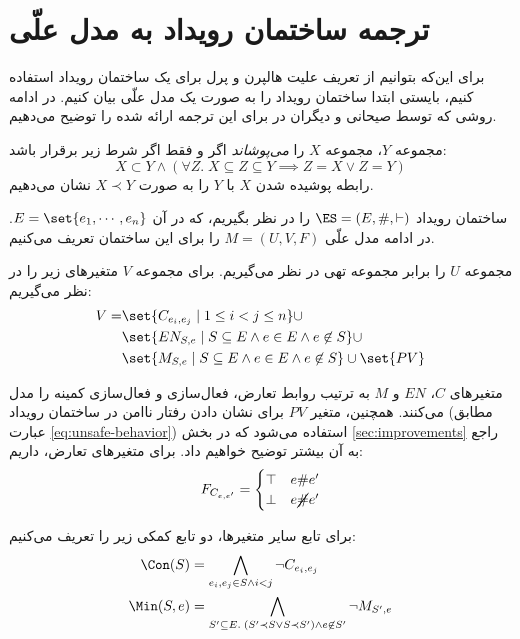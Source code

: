 \section{ترجمه ساختمان رویداد به مدل علّی}\label{sec:es-to-cm}

برای این‌که بتوانیم از تعریف علیت هالپرن و پرل
برای یک ساختمان رویداد استفاده کنیم، بایستی ابتدا
ساختمان رویداد را به صورت یک مدل علّی بیان کنیم. در ادامه
روشی که توسط صیحانی و دیگران در
\cite{seyhani2022}
برای این ترجمه ارائه شده را توضیح می‌دهیم.

\begin{definition}
  مجموعه $Y$،
  مجموعه $X$
  را \textit{می‌پوشاند}
  اگر و فقط اگر شرط زیر برقرار باشد:
  \begin{equation*}
    X \subset Y \wedge \left(
      \forall Z.\;
      X \subseteq Z \subseteq Y \implies Z=X \vee Z=Y 
    \right)
  \end{equation*}
  رابطه پوشیده شدن
  $X$ با $Y$
  را به صورت
  $X \prec Y$
  نشان می‌دهیم.
\end{definition}

ساختمان رویداد
$\ES=(E,\#,\vdash)$
را در نظر بگیریم، که در آن
$E=\set{e_1,\cdots,e_n}$.
در ادامه مدل علّی
$M=(U,V,F)$
را برای این ساختمان تعریف می‌کنیم.

مجموعه $U$
را برابر مجموعه تهی در نظر می‌گیریم.
برای مجموعه $V$
متغیرهای زیر را در نظر می‌گیریم:
\begin{align}
  V = & \set{C_{e_i,e_j} \mid 1 \leq i < j \leq n} \cup \\
  & \set{
    EN_{S,e} \mid
    S \subseteq E \wedge e \in E \wedge e \not\in S
  } \cup \\
  & \set{
    M_{S,e} \mid
    S \subseteq E \wedge e \in E \wedge e \not\in S
  } \cup \set{PV}
\end{align}

متغیرهای
$C$، $EN$ و $M$
به ترتیب روابط تعارض، فعال‌سازی و فعال‌سازی کمینه
را مدل می‌کنند. همچنین، متغیر
$PV$
برای نشان دادن رفتار ناامن در ساختمان رویداد
(مطابق عبارت \ref{eq:unsafe-behavior})
استفاده می‌شود که در بخش
\ref{sec:improvements}
راجع به آن بیشتر توضیح خواهیم داد.
برای متغیرهای تعارض، داریم:
\begin{equation*}
  F_{C_{e,e'}} = \begin{cases}
    \top  & e \# e' \\
    \bot  & e \cancel{\#} e'
  \end{cases}
\end{equation*}

برای تابع سایر متغیرها، دو تابع کمکی زیر را تعریف می‌کنیم:
\begin{align*}
  \Con(S) & =
  \bigwedge_{e_i,e_j \in S \wedge i < j} \neg C_{e_i,e_j} \\
  \Min(S,e) & = \bigwedge_{
    S' \subseteq E.\;
    (S' \prec S \vee S \prec S') \wedge e \not\in S'
  } \neg M_{S',e}
\end{align*}

